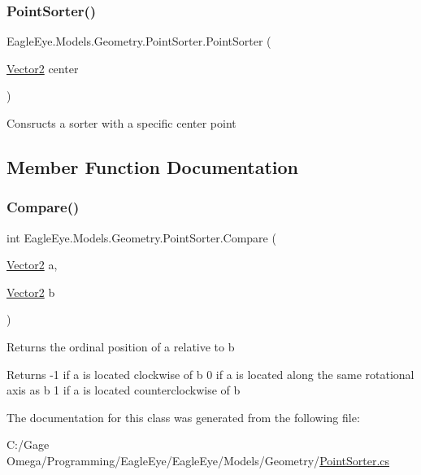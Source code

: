 \subsubsection{\texorpdfstring{PointSorter()}{PointSorter()}}
{\footnotesize\ttfamily Eagle\+Eye.\+Models.\+Geometry.\+Point\+Sorter.\+Point\+Sorter (\begin{DoxyParamCaption}\item[{\mbox{\hyperlink{struct_eagle_eye_1_1_models_1_1_geometry_1_1_vector2}{Vector2}}}]{center }\end{DoxyParamCaption})}



Consructs a sorter with a specific center point 



\subsection{Member Function Documentation}
\mbox{\label{class_eagle_eye_1_1_models_1_1_geometry_1_1_point_sorter_a418d1236f488e527d3f236efef379d3b}} 
\subsubsection{\texorpdfstring{Compare()}{Compare()}}
{\footnotesize\ttfamily int Eagle\+Eye.\+Models.\+Geometry.\+Point\+Sorter.\+Compare (\begin{DoxyParamCaption}\item[{\mbox{\hyperlink{struct_eagle_eye_1_1_models_1_1_geometry_1_1_vector2}{Vector2}}}]{a,  }\item[{\mbox{\hyperlink{struct_eagle_eye_1_1_models_1_1_geometry_1_1_vector2}{Vector2}}}]{b }\end{DoxyParamCaption})}



Returns the ordinal position of a relative to b 

\begin{DoxyReturn}{Returns}
-\/1 if a is located clockwise of b 0 if a is located along the same rotational axis as b 1 if a is located counterclockwise of b 
\end{DoxyReturn}


The documentation for this class was generated from the following file\+:\begin{DoxyCompactItemize}
\item 
C\+:/\+Gage Omega/\+Programming/\+Eagle\+Eye/\+Eagle\+Eye/\+Models/\+Geometry/\mbox{\hyperlink{_point_sorter_8cs}{Point\+Sorter.\+cs}}\end{DoxyCompactItemize}
